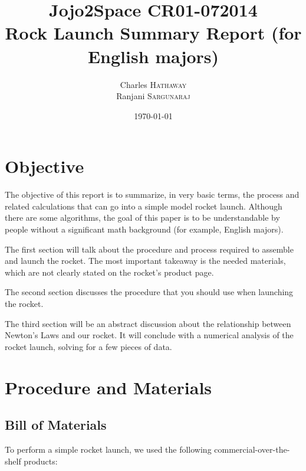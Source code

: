 \documentclass{article}
\title{Jojo2Space CR01-072014\\Rock Launch Summary Report (for English majors)} %
\author{Charles \textsc{Hathaway} \\Ranjani \textsc{Sargunaraj}} %
\date{\today} %
\begin{document}
\maketitle %



\section{Objective}

The objective of this report is to summarize, in very basic terms, the process and related calculations that can go into a simple model rocket launch.
Although there are some algorithms, the goal of this paper is to be understandable by people without a significant math background (for example, English majors).

The first section will talk about the procedure and process required to assemble and launch the rocket.
The most important takeaway is the needed materials, which are not clearly stated on the rocket's product page.

The second section discusses the procedure that you should use when launching the rocket.

The third section will be an abstract discussion about the relationship between Newton's Laws and our rocket.
It will conclude with a numerical analysis of the rocket launch, solving for a few pieces of data.
 
\section{Procedure and Materials}

\subsection{Bill of Materials}

To perform a simple rocket launch, we used the following commercial-over-the-shelf products:
\end{document}
